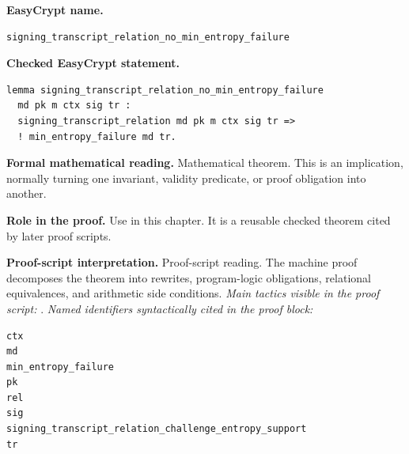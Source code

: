 \begin{formaltheorem}
\noindent\textbf{EasyCrypt name.}
\begin{lstlisting}[language=EasyCrypt,basicstyle=\ttfamily\scriptsize]
signing_transcript_relation_no_min_entropy_failure
\end{lstlisting}
\noindent\textbf{Checked EasyCrypt statement.}
\begin{lstlisting}[language=EasyCrypt,basicstyle=\ttfamily\scriptsize]
lemma signing_transcript_relation_no_min_entropy_failure
  md pk m ctx sig tr :
  signing_transcript_relation md pk m ctx sig tr =>
  ! min_entropy_failure md tr.
\end{lstlisting}
\noindent\textbf{Formal mathematical reading.}
Mathematical theorem. This is an implication, normally turning one invariant, validity predicate, or proof obligation into another.

\noindent\textbf{Role in the proof.}
Use in this chapter. It is a reusable checked theorem cited by later proof scripts.

\noindent\textbf{Proof-script interpretation.}
Proof-script reading. The machine proof decomposes the theorem into rewrites, program-logic obligations, relational equivalences, and arithmetic side conditions.
\emph{Main tactics visible in the proof script:} .
\emph{Named identifiers syntactically cited in the proof block:}
\begin{lstlisting}[language=EasyCrypt,basicstyle=\ttfamily\scriptsize]
ctx
md
min_entropy_failure
pk
rel
sig
signing_transcript_relation_challenge_entropy_support
tr
\end{lstlisting}

\end{formaltheorem}

